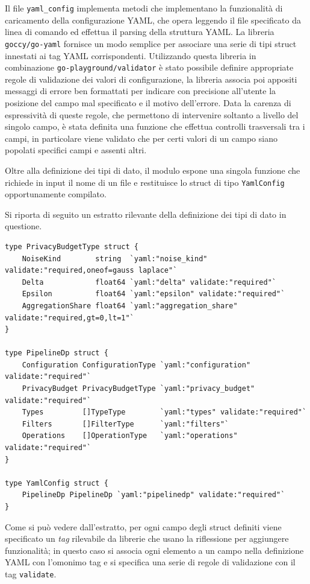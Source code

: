 Il file \texttt{yaml\_config} implementa metodi che implementano la funzionalità di caricamento della configurazione YAML, che opera leggendo il file specificato da linea di comando ed effettua il parsing della struttura YAML. La libreria \texttt{goccy/go-yaml} fornisce un modo semplice per associare una serie di tipi struct innestati ai tag YAML corrispondenti. Utilizzando questa libreria in combinazione \texttt{go-playground/validator} è stato possibile definire appropriate regole di validazione dei valori di configurazione, la libreria associa poi appositi messaggi di errore ben formattati per indicare con precisione all'utente la posizione del campo mal specificato e il motivo dell'errore. Data la carenza di espressività di queste regole, che permettono di intervenire soltanto a livello del singolo campo, è stata definita una funzione che effettua controlli trasversali tra i campi, in particolare viene validato che per certi valori di un campo siano popolati specifici campi e assenti altri.

Oltre alla definizione dei tipi di dato, il modulo espone una singola funzione che richiede in input il nome di un file e restituisce lo struct di tipo \texttt{YamlConfig} opportunamente compilato.

Si riporta di seguito un estratto rilevante della definizione dei tipi di dato in questione.
\begin{verbatim}
type PrivacyBudgetType struct {
	NoiseKind        string  `yaml:"noise_kind" validate:"required,oneof=gauss laplace"`
	Delta            float64 `yaml:"delta" validate:"required"`
	Epsilon          float64 `yaml:"epsilon" validate:"required"`
	AggregationShare float64 `yaml:"aggregation_share" validate:"required,gt=0,lt=1"`
}

type PipelineDp struct {
	Configuration ConfigurationType `yaml:"configuration" validate:"required"`
	PrivacyBudget PrivacyBudgetType `yaml:"privacy_budget" validate:"required"`
	Types         []TypeType        `yaml:"types" validate:"required"`
	Filters       []FilterType      `yaml:"filters"`
	Operations    []OperationType   `yaml:"operations" validate:"required"`
}

type YamlConfig struct {
	PipelineDp PipelineDp `yaml:"pipelinedp" validate:"required"`
}
\end{verbatim}
Come si può vedere dall'estratto, per ogni campo degli struct definiti viene specificato un \textit{tag} rilevabile da librerie che usano la riflessione per aggiungere funzionalità; in questo caso si associa ogni elemento a un campo nella definizione YAML con l'omonimo tag e si specifica una serie di regole di validazione con il tag \texttt{validate}.

